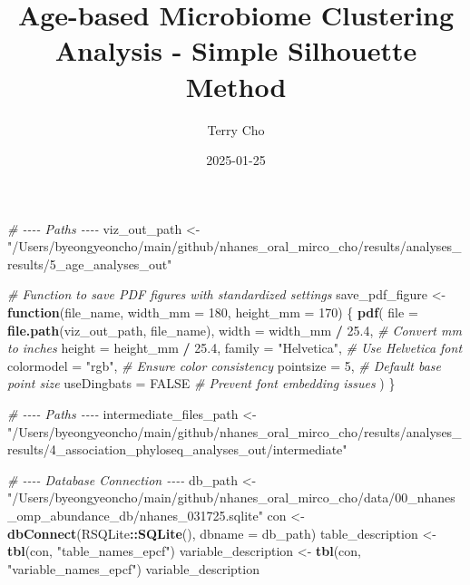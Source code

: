 \documentclass[
]{article}
\title{Age-based Microbiome Clustering Analysis - Simple Silhouette
Method}
\author{Terry Cho}
\date{2025-01-25}
\newenvironment{Shaded}{\begin{snugshade}}{\end{snugshade}}
\newcommand{\AttributeTok}[1]{\textcolor[rgb]{0.13,0.29,0.53}{#1}}
\newcommand{\CommentTok}[1]{\textcolor[rgb]{0.56,0.35,0.01}{\textit{#1}}}
\newcommand{\ConstantTok}[1]{\textcolor[rgb]{0.56,0.35,0.01}{#1}}
\newcommand{\ControlFlowTok}[1]{\textcolor[rgb]{0.13,0.29,0.53}{\textbf{#1}}}
\newcommand{\DecValTok}[1]{\textcolor[rgb]{0.00,0.00,0.81}{#1}}
\newcommand{\FloatTok}[1]{\textcolor[rgb]{0.00,0.00,0.81}{#1}}
\newcommand{\FunctionTok}[1]{\textcolor[rgb]{0.13,0.29,0.53}{\textbf{#1}}}
\newcommand{\NormalTok}[1]{#1}
\newcommand{\OtherTok}[1]{\textcolor[rgb]{0.56,0.35,0.01}{#1}}
\newcommand{\SpecialCharTok}[1]{\textcolor[rgb]{0.81,0.36,0.00}{\textbf{#1}}}
\newcommand{\StringTok}[1]{\textcolor[rgb]{0.31,0.60,0.02}{#1}}
\begin{document}
\maketitle

\begin{Shaded}
\begin{Highlighting}[]
\CommentTok{\# {-}{-}{-}{-} Paths {-}{-}{-}{-}}
\NormalTok{viz\_out\_path }\OtherTok{\textless{}{-}} \StringTok{"/Users/byeongyeoncho/main/github/nhanes\_oral\_mirco\_cho/results/analyses\_results/5\_age\_analyses\_out"}

\CommentTok{\# Function to save PDF figures with standardized settings}
\NormalTok{save\_pdf\_figure }\OtherTok{\textless{}{-}} \ControlFlowTok{function}\NormalTok{(file\_name, }\AttributeTok{width\_mm =} \DecValTok{180}\NormalTok{, }\AttributeTok{height\_mm =} \DecValTok{170}\NormalTok{) \{}
  \FunctionTok{pdf}\NormalTok{(}
    \AttributeTok{file =} \FunctionTok{file.path}\NormalTok{(viz\_out\_path, file\_name),}
    \AttributeTok{width =}\NormalTok{ width\_mm }\SpecialCharTok{/} \FloatTok{25.4}\NormalTok{,  }\CommentTok{\# Convert mm to inches}
    \AttributeTok{height =}\NormalTok{ height\_mm }\SpecialCharTok{/} \FloatTok{25.4}\NormalTok{,}
    \AttributeTok{family =} \StringTok{"Helvetica"}\NormalTok{,     }\CommentTok{\# Use Helvetica font}
    \AttributeTok{colormodel =} \StringTok{"rgb"}\NormalTok{,       }\CommentTok{\# Ensure color consistency}
    \AttributeTok{pointsize =} \DecValTok{5}\NormalTok{,            }\CommentTok{\# Default base point size}
    \AttributeTok{useDingbats =} \ConstantTok{FALSE}       \CommentTok{\# Prevent font embedding issues}
\NormalTok{  )}
\NormalTok{\}}

\CommentTok{\# {-}{-}{-}{-} Paths {-}{-}{-}{-}}
\NormalTok{intermediate\_files\_path }\OtherTok{\textless{}{-}} \StringTok{"/Users/byeongyeoncho/main/github/nhanes\_oral\_mirco\_cho/results/analyses\_results/4\_association\_phyloseq\_analyses\_out/intermediate"}

\CommentTok{\# {-}{-}{-}{-} Database Connection {-}{-}{-}{-}}
\NormalTok{db\_path }\OtherTok{\textless{}{-}} \StringTok{"/Users/byeongyeoncho/main/github/nhanes\_oral\_mirco\_cho/data/00\_nhanes\_omp\_abundance\_db/nhanes\_031725.sqlite"}
\NormalTok{con }\OtherTok{\textless{}{-}} \FunctionTok{dbConnect}\NormalTok{(RSQLite}\SpecialCharTok{::}\FunctionTok{SQLite}\NormalTok{(), }\AttributeTok{dbname =}\NormalTok{ db\_path)}
\NormalTok{table\_description }\OtherTok{\textless{}{-}} \FunctionTok{tbl}\NormalTok{(con, }\StringTok{"table\_names\_epcf"}\NormalTok{)}
\NormalTok{variable\_description }\OtherTok{\textless{}{-}} \FunctionTok{tbl}\NormalTok{(con, }\StringTok{"variable\_names\_epcf"}\NormalTok{)}
\NormalTok{variable\_description}
\end{Highlighting}
\end{Shaded}
\end{document}

